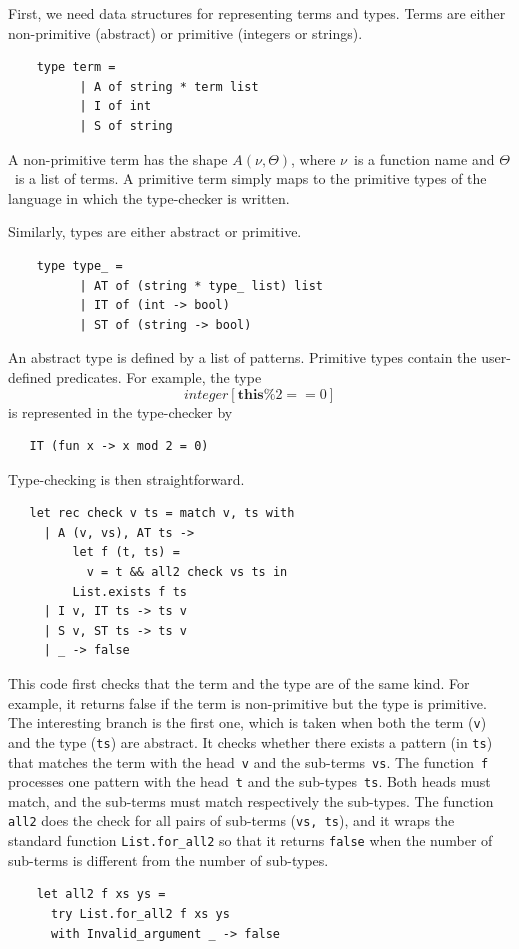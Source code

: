 \documentclass[a4paper,12pt,oneside,fleqn]{book} %
\begin{document}
{First, we need data structures for representing terms and types. Terms are
either non-primitive (abstract) or primitive (integers or strings).
\begin{verbatim}
    type term =
          | A of string * term list
          | I of int
          | S of string
\end{verbatim}
A non-primitive term has the shape $A(\nu,\Theta)$, where $\nu$~is a
function name and $\Theta$~is a list of terms. A primitive term simply maps
to the primitive types of the language in which the type-checker is
written.

Similarly, types are either abstract or primitive.
\begin{verbatim}
    type type_ =
          | AT of (string * type_ list) list
          | IT of (int -> bool)
          | ST of (string -> bool)
\end{verbatim}
An abstract type is defined by a list of patterns. Primitive types contain the
user-defined predicates. For example, the type
\[\mathit{integer}[\mathbf{this}\%2==0]\] is represented in the type-checker by
\begin{verbatim}
   IT (fun x -> x mod 2 = 0)
\end{verbatim}

Type-checking is then straightforward.
\begin{verbatim}
   let rec check v ts = match v, ts with
     | A (v, vs), AT ts ->
         let f (t, ts) =
           v = t && all2 check vs ts in
         List.exists f ts
     | I v, IT ts -> ts v
     | S v, ST ts -> ts v
     | _ -> false
\end{verbatim}
This code first checks that the term and the type are of the same kind. For
example, it returns false if the term is non-primitive but the type is
primitive. The interesting branch is the first one, which is taken when
both the term (\verb|v|) and the type (\verb|ts|) are abstract. It checks whether there exists a
pattern (in \verb|ts|) that matches the term with the head~\verb|v| and the
sub-terms~\verb|vs|. The function~\verb|f| processes one pattern with the
head~\verb|t| and the sub-types~\verb|ts|. Both heads must match, and the
sub-terms must match respectively the sub-types. The function \verb|all2|
does the check for all pairs of sub-terms (\verb|vs, ts|), and it
wraps the standard function \verb|List.for_all2| so that it returns
\verb|false| when the number of sub-terms is different from the number of
sub-types.
\begin{verbatim}
    let all2 f xs ys =
      try List.for_all2 f xs ys
      with Invalid_argument _ -> false
\end{verbatim}

}
\end{document}
